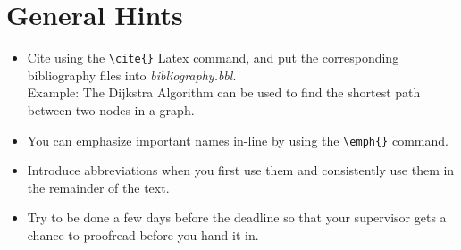 \section{General Hints}

\begin{itemize}
\item Cite using the \verb|\cite{}|  Latex command, and put the corresponding bibliography files into \emph{bibliography.bbl}.\\Example: The Dijkstra Algorithm \cite{dijkstra1959note} can be used to find the shortest path between two nodes in a graph.
\item You can emphasize important names in-line by using the \verb|\emph{}| command.
\item Introduce abbreviations when you first use them and consistently use them in the remainder of the text.
\item Try to be done a few days before the deadline so that your supervisor gets a chance to proofread before you hand it in.
\end{itemize}